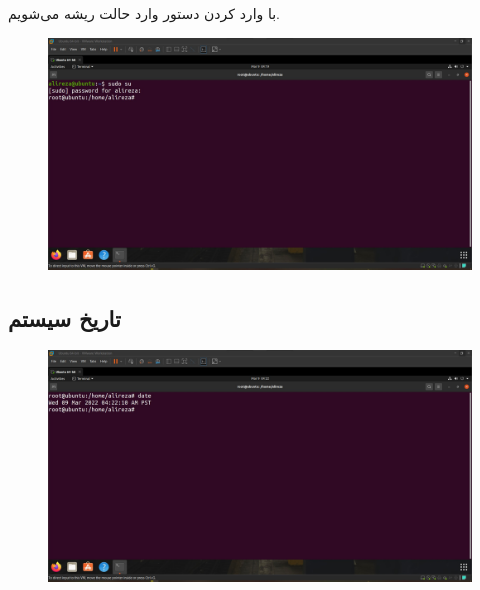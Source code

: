 \documentclass{article}
\begin{document}
\section{}
با وارد کردن دستور  وارد حالت ریشه می‌شویم.
\begin{figure}[H]
    \centering
    \includegraphics[width=1.0\textwidth]{figures/2.jpg}
    \caption
	{
	}
    \label{fig:fig1}
\end{figure}

\subsection{تاریخ سیستم}
\begin{figure}[H]
    \centering
    \includegraphics[width=1.0\textwidth]{figures/2a.jpg}
    \caption
	{
	}
    \label{fig:fig1}
\end{figure}
\end{document}
